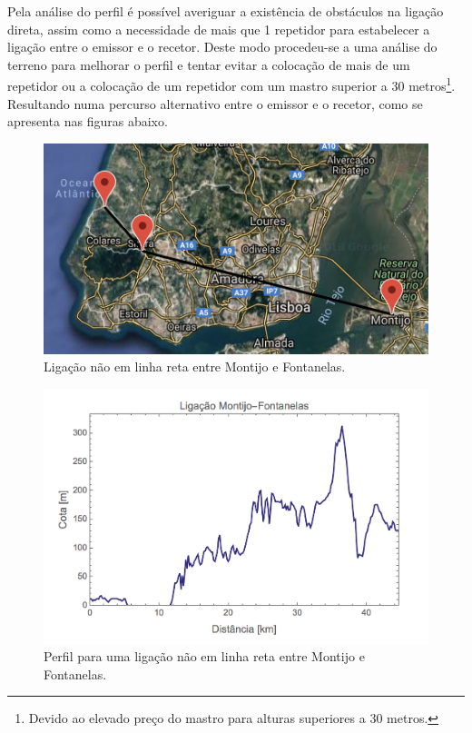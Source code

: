 Pela análise do perfil é possível averiguar a existência de obstáculos na ligação direta, assim como a necessidade de mais que 1 repetidor para estabelecer a ligação entre o emissor e o recetor. Deste modo procedeu-se a uma análise do terreno para melhorar o perfil e tentar evitar a colocação de mais de um repetidor ou a colocação de um repetidor com um mastro superior a 30 metros\footnote{Devido ao elevado preço do mastro para alturas superiores a 30 metros.}. Resultando numa percurso alternativo entre o emissor e o recetor, como se apresenta nas figuras abaixo.

\begin{figure}[H]
\includegraphics[scale=0.5]{ligacao_m-s-f.png}
\centering
\caption{Ligação não em linha reta entre Montijo e Fontanelas.}
\end{figure}
\begin{figure}[H]
\includegraphics[scale=0.5]{perfil.png}
\centering
\caption{Perfil para uma ligação não em linha reta entre Montijo e Fontanelas.}
\end{figure}

